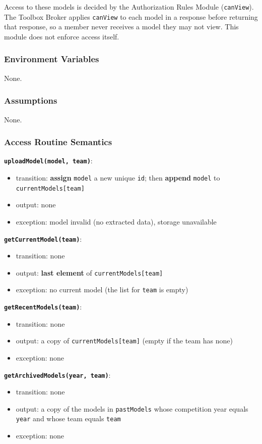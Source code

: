 \documentclass[12pt, titlepage]{article}
\begin{document}
Access to these models is decided by the Authorization Rules Module (\texttt{canView}). The Toolbox Broker applies \texttt{canView} to each model in a response before returning that response, so a member never receives a model they may not view. This module does not enforce access itself.

\subsubsection{Environment Variables}
None.

\subsubsection{Assumptions}
None.

\subsubsection{Access Routine Semantics}

\textbf{\texttt{uploadModel(model, team)}}:
\begin{itemize}
  \item transition: \textbf{assign} \texttt{model} a new unique \texttt{id}; then \textbf{append} \texttt{model} to \texttt{currentModels[team]}
  \item output: none
  \item exception: model invalid (no extracted data), storage unavailable
\end{itemize}

\textbf{\texttt{getCurrentModel(team)}}:
\begin{itemize}
  \item transition: none
  \item output: \textbf{last element} of \texttt{currentModels[team]}
  \item exception: no current model (the list for \texttt{team} is empty)
\end{itemize}

\textbf{\texttt{getRecentModels(team)}}:
\begin{itemize}
  \item transition: none
  \item output: a copy of \texttt{currentModels[team]} (empty if the team has none)
  \item exception: none
\end{itemize}

\textbf{\texttt{getArchivedModels(year, team)}}:
\begin{itemize}
  \item transition: none
  \item output: a copy of the models in \texttt{pastModels} whose competition year equals \texttt{year} and whose team equals \texttt{team}
  \item exception: none
\end{itemize}
\end{document}
